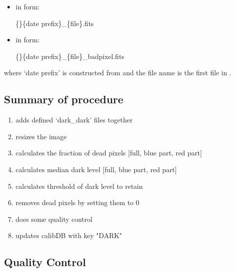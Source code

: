 \begin{itemize}
\item {} in form:
\begin{tcustomdir}
\{\reduceddir\}\{date prefix\}\_\{file\}.fits
\end{tcustomdir}

\item {} in form:
\begin{tcustomdir}
\{\reduceddir\}\{date prefix\}\_\{file\}\_badpixel.fits
\end{tcustomdir}
\end{itemize}

\noindent where `date prefix' is constructed from \argnightname and the file name is the first file in \argfilenames.

\subsection{Summary of procedure}
\begin{enumerate}
\item adds defined `dark\_dark' files together
\item resizes the image
\item calculates the fraction of dead pixels [full, blue part, red part]
\item calculates median dark level [full, blue part, red part]
\item calculates threshold of dark level to retain
\item removes dead pixels by setting them to 0
\item does some quality control
\item updates calibDB with key "DARK"
\end{enumerate}


\subsection{Quality Control}


